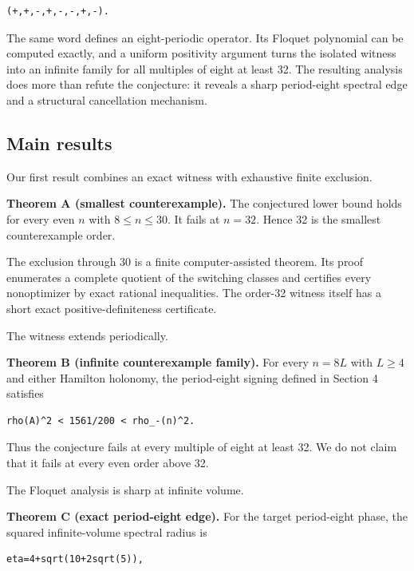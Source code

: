 \begin{lstlisting}[language={}]
(+,+,-,+,-,-,+,-).
\end{lstlisting}

The same word defines an eight-periodic operator. Its Floquet polynomial can be
computed exactly, and a uniform positivity argument turns the isolated witness
into an infinite family for all multiples of eight at least 32. The resulting
analysis does more than refute the conjecture: it reveals a sharp period-eight
spectral edge and a structural cancellation mechanism.

\subsection{Main results}

Our first result combines an exact witness with exhaustive finite exclusion.

\textbf{Theorem A (smallest counterexample).}  The conjectured lower bound holds for
every even \(n\) with \(8\le n\le 30\). It fails at \(n=32\). Hence 32 is the smallest
counterexample order.

The exclusion through 30 is a finite computer-assisted theorem. Its proof
enumerates a complete quotient of the switching classes and certifies every
nonoptimizer by exact rational inequalities. The order-32 witness itself has a
short exact positive-definiteness certificate.

The witness extends periodically.

\textbf{Theorem B (infinite counterexample family).}  For every \(n=8L\) with \(L\ge 4\)
and either Hamilton holonomy, the period-eight signing defined in Section 4
satisfies

\begin{lstlisting}[language={}]
rho(A)^2 < 1561/200 < rho_-(n)^2.
\end{lstlisting}

Thus the conjecture fails at every multiple of eight at least 32. We do not
claim that it fails at every even order above 32.

The Floquet analysis is sharp at infinite volume.

\textbf{Theorem C (exact period-eight edge).}  For the target period-eight phase,
the squared infinite-volume spectral radius is

\begin{lstlisting}[language={}]
eta=4+sqrt(10+2sqrt(5)),
\end{lstlisting}

